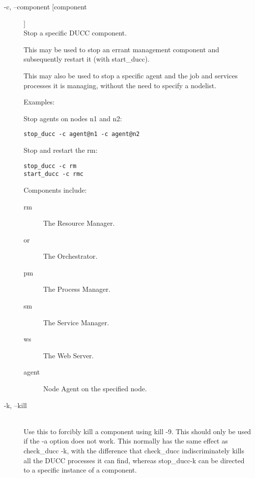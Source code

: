 \begin{description}
          \item[-c, --component [component]] \hfill \\
            Stop a specific DUCC component. 

            This may be used to stop an errant management component and subsequently restart it 
            (with start\_ducc). 
            
            This may also be used to stop a specific agent and the job and services processes it is
            managing, without the need to specify a nodelist.  
            
            Examples: 

            Stop agents on nodes n1 and n2:
\begin{verbatim}
stop_ducc -c agent@n1 -c agent@n2 
\end{verbatim}
            
            Stop and restart the rm: 
\begin{verbatim}
stop_ducc -c rm 
start_ducc -c rmc 
\end{verbatim}
            
            Components include: 
            \begin{description}
              \item[rm] The Resource Manager.                 
              \item[or] The Orchestrator.                 
              \item[pm] The Process Manager.                 
              \item[sm] The Service Manager.                 
              \item[ws] The Web Server.                 
              \item[agent\@node] Node Agent on the specified node.
              \end{description}
              
            \item[-k, --kill] \hfill \\
              Use this to forcibly kill a component using kill -9. This should only be used if the -a option 
              does not work. This normally has the same effect as check\_ducc -k, with the difference that 
              check\_ducc indiscriminately kills all the DUCC processes it can find, whereas stop\_ducc-k 
              can be directed to a specific instance of a component. 

       \end{description}
            

